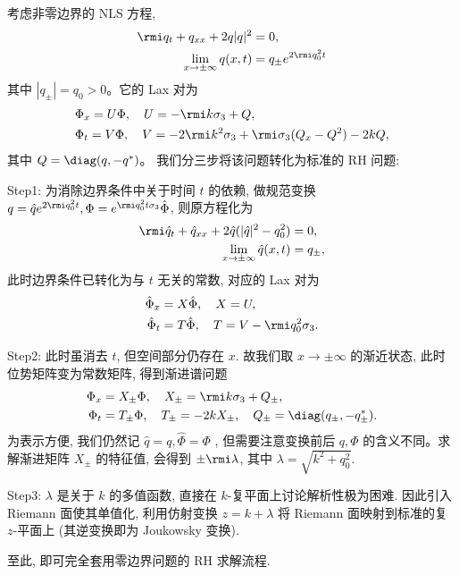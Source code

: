 \begin{outline}[大致思路]

    考虑非零边界的 NLS 方程,
    \begin{align}
        \rmi q_{t} + q_{xx} + 2 q | q|^2 & = 0,                           \\
        \lim_{x \to \pm \infty} q(x,t)   & = q_{\pm} e^{2 \rmi q_{0}^2 t}
    \end{align}
    其中 $|q_{\pm}| = q_0 > 0$。它的 Lax 对为
    \begin{equation}
        \begin{aligned}
             & \Phi_x = U \Phi, \quad U = -\rmi k \sigma_3 + Q,                                          \\
             & \Phi_t = V \Phi, \quad V = -2\rmi k^2 \sigma_3 + \rmi \sigma_{3} (Q_{x} - Q^{2}) - 2 k Q,
        \end{aligned}
    \end{equation}
    其中 $ Q = \diag(q, -q^{*}) $。
    我们分三步将该问题转化为标准的 RH 问题:

    Step1: 为消除边界条件中关于时间 $ t $ 的依赖, 做规范变换 $ q = \hat{q} e^{2 \rmi q_{0}^{2} t}, \Phi = e^{\rmi q_{0}^{2} t \sigma_{3}} \hat{\Phi} $, 则原方程化为
    \begin{align}
        \rmi \hat{q}_{t} + \hat{q}_{xx} + 2 \hat{q} (|\hat{q}|^{2}-q_{0}^{2}) & = 0,       \\
        \lim_{x \to \pm \infty} \hat{q}(x,t)                                  & = q_{\pm},
    \end{align}
    此时边界条件已转化为与 $t$ 无关的常数, 对应的 Lax 对为
    \begin{align}
        \hat{\Phi}_{x} & = X \hat{\Phi}, \quad X = U,                             \\
        \hat{\Phi}_{t} & = T \hat{\Phi}, \quad T = V - \rmi q_{0}^{2} \sigma_{3}.
    \end{align}

    Step2: 此时虽消去 $t$, 但空间部分仍存在 $x$. 故我们取 $ x \to \pm\infty $ 的渐近状态, 此时位势矩阵变为常数矩阵, 得到渐进谱问题
    \begin{align}
        \Phi_{x} & = X_{\pm} \Phi, \quad X_{\pm} = \rmi k \sigma_{3} + Q_{\pm},                                \\
        \Phi_{t} & = T_{\pm} \Phi, \quad T_{\pm} = -2 k X_{\pm}, \quad Q_{\pm} = \diag(q_{\pm}, -q_{\pm}^{*}).
    \end{align}
    为表示方便, 我们仍然记 $ \hat{q}=q, \hat{\Phi} = \Phi$ , 但需要注意变换前后 $ q, \Phi $ 的含义不同。求解渐进矩阵 $X_{\pm}$ 的特征值, 会得到 $\pm \rmi \lambda$, 其中 $\lambda = \sqrt{k^2 + q_0^2}$.

    Step3: %
    $\lambda$ 是关于 $k$ 的多值函数, 直接在 $k$-复平面上讨论解析性极为困难. 因此引入 Riemann 面使其单值化,  利用仿射变换 $ z = k + \lambda$ 将 Riemann 面映射到标准的复 $z$-平面上 (其逆变换即为 Joukowsky 变换).

    至此, 即可完全套用零边界问题的 RH 求解流程.
\end{outline}
